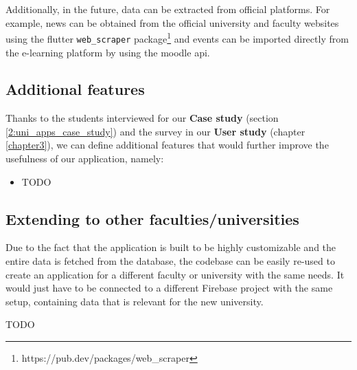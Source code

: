     Additionally, in the future, data can be extracted from official platforms. For example, news can be obtained from the official university and faculty websites using the \gls{flutter} \texttt{web_scraper} package\footnote{https://pub.dev/packages/web\_scraper} and events can be imported directly from the e-learning platform by using the \gls{moodle} \acrshort{api}.
    
    \subsection{Additional features} \label{6:future_features}
    
    Thanks to the students interviewed for our \textbf{Case study} (section \ref{2:uni_apps_case_study}) and the survey in our \textbf{User study} (chapter \ref{chapter3}), we can define additional features that would further improve the usefulness of our application, namely:
    \begin{itemize}
        \item TODO
    \end{itemize}
    
    \subsection{Extending to other faculties/universities} \label{6:future_extending}
    Due to the fact that the application is built to be highly customizable and the entire data is fetched from the database, the codebase can be easily re-used to create an application for a different faculty or university with the same needs. It would just have to be connected to a different Firebase project with the same setup, containing data that is relevant for the new university.
    
    TODO %